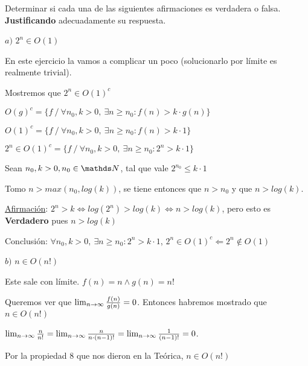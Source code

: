 \documentclass[10pt,a4paper]{article}
\begin{document}
\par Determinar si cada una de las siguientes afirmaciones es verdadera o falsa. \textbf{Justificando} adecuadamente su respuesta.
\demoline
\par $a)$ \ensuremath{2^n \in O(1)}
\demoline
\begin{groupIzq}{2.5em}
  \par En este ejercicio la vamos a complicar un poco (solucionarlo por límite es realmente trivial).
  \par Mostremos que \ensuremath{2^n \in O(1)^c}
  \par \ensuremath{O(g)^c = \{f\ /\ \forall n_0, k > 0,\ \exists n \geq n_0: f(n) > k \cdot g(n) \}}
  \par \ensuremath{O(1)^c = \{f\ /\ \forall n_0, k > 0,\ \exists n \geq n_0: f(n) > k \cdot 1 \}}
  \par \ensuremath{2^n \in O(1)^c = \{f\ /\ \forall n_0, k > 0,\ \exists n \geq n_0: 2^n > k \cdot 1 \}}
  \demoline
  \par Sean \ensuremath{n_0, k > 0, n_0 \in \nat}, tal que vale \ensuremath{2^{n_0} \leq k \cdot 1}
  \par Tomo \ensuremath{n > max(n_0, log(k))}, se tiene entonces que \ensuremath{n > n_0} y que \ensuremath{n > log(k)}.
  \par \underline{Afirmación}: \ensuremath{2^n > k \Leftrightarrow log(2^n) > log(k) \Leftrightarrow n > log(k)}, pero esto es \textbf{Verdadero} pues \ensuremath{n > log(k)}
  \par Conclusión: \ensuremath{\forall n_0, k > 0,\ \exists n \geq n_0: 2^n > k \cdot 1}, \ensuremath{2^n \in O(1)^c \Leftarrow 2^n \notin O(1)}
  \par 
\end{groupIzq}

\demoline
\demoline
\par $b)$ \ensuremath{n \in O(n!)}
\demoline
\begin{groupIzq}{2.5em}
  \par Este sale con límite. \ensuremath{f(n) = n \land g(n) = n!}
  \par Queremos ver que \ensuremath{\limn \frac{f(n)}{g(n)} = 0}. Entonces habremos mostrado que \ensuremath{n \in O(n!)}
  \par \ensuremath{\limn \frac{n}{n!} = \limn\frac{n}{n \cdot (n - 1)!} = \limn\frac{1}{(n-1)!} = 0}.
  \par Por la propiedad 8 que nos dieron en la Teórica, \ensuremath{n \in O(n!)}
\end{groupIzq}
\end{document}

